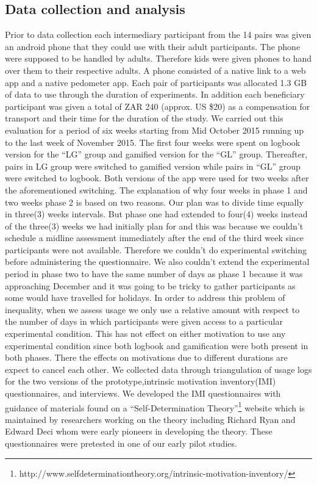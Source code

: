 \documentclass{sig-alternate}
\begin{document}
\subsection{Data collection and analysis} 
Prior to data collection each intermediary participant from the 14 pairs was given an android phone that they could use with their adult participants. The phone were supposed to be handled by adults. Therefore kids were given phones to hand over them to their respective adults. A phone consisted of a native link to a web app and a native pedometer app.  Each pair of participants was allocated 1.3 GB of data to use through the duration of experiments. In addition each beneficiary participant was given a total of ZAR 240 (approx. US \$20) as a compensation for transport and their time for the duration of the study.\newline
We carried out this evaluation for a period of six weeks starting from Mid October 2015 running up to the last week of November 2015. The first four weeks were spent on logbook version for the ``LG'' group and  gamified version for the ``GL'' group. Thereafter, pairs in LG group were switched to gamified version while pairs in ``GL'' group were switched to logbook. Both versions of the app were used for two weeks after the aforementioned switching. The explanation of why four weeks in phase 1 and two weeks phase 2 is based on two reasons. Our plan was to divide time equally in three(3) weeks intervals. But phase one had extended to four(4) weeks instead of the three(3) weeks we had initially plan for and this was because we couldn't schedule a midline assessment immediately after the end of the third week since participants were not available. Therefore we couldn't do experimental switching before administering the questionnaire. We also couldn't extend the experimental period in phase two to have the same number of days as phase 1 because it was approaching December and it was going to be tricky to gather participants as some would have travelled for holidays. In order to address this problem of inequality, when we assess usage we only use a relative amount with respect to the number of days in which participants were given access to a particular experimental condition. This has not effect on either motivation to use any experimental condition since both logbook and gamification were both present in both phases. There the effects on motivations due to different durations are expect to cancel each other.\newline
We collected data through triangulation of usage logs for the two versions of the prototype,intrinsic motivation inventory(IMI) questionnaires, and interviews. We developed the IMI questionnaires with guidance of materials found on a ``Self-Determination Theory''\footnote{http://www.selfdeterminationtheory.org/intrinsic-motivation-inventory/} website which is maintained by researchers working on the theory including Richard Ryan and Edward Deci\cite{deci1985intrinsic} whom were early pioneers in developing the theory. These questionnaires were pretested in one of our early pilot studies.\newline
\end{document}
